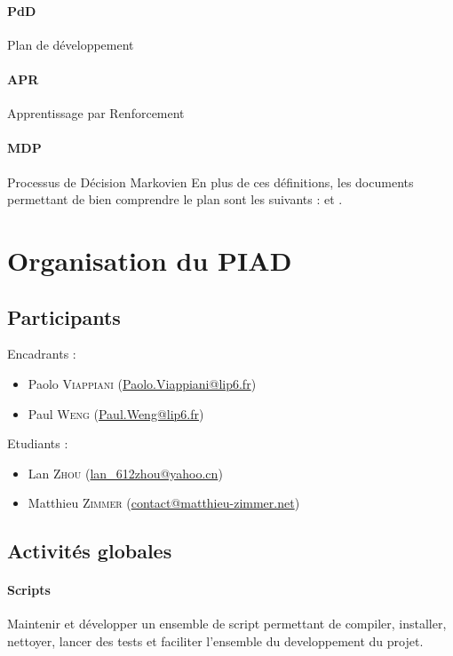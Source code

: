 \documentclass[a4paper,12pt]{article}
\begin{document}
   \paragraph{PdD} Plan de développement
   
   \paragraph{APR} Apprentissage par Renforcement
   
   \paragraph{MDP} Processus de Décision Markovien
  \bigskip
  En plus de ces définitions, les documents permettant de bien 
    comprendre le plan sont les suivants : \cite{PDMIA} et \cite{ReinforceLearningIntro}.
  
  \newpage 
  \section{Organisation du PIAD}

    \subsection{Participants}
	Encadrants :
	\begin{itemize}
		\item Paolo \textsc{Viappiani} (\href{mailto:Paolo.Viappiani@lip6.fr}{Paolo.Viappiani@lip6.fr})
		\item Paul \textsc{Weng} (\href{mailto:Paul.Weng@lip6.fr }{Paul.Weng@lip6.fr})
	\end{itemize}

	\bigskip
	Etudiants :
	\begin{itemize}
		\item Lan \textsc{Zhou} (\href{mailto:lan\_612zhou@yahoo.cn}{lan\_612zhou@yahoo.cn})
		\item Matthieu \textsc{Zimmer} (\href{mailto:contact@matthieu-zimmer.net}{contact@matthieu-zimmer.net})
	\end{itemize}

    
    \subsection{Activités globales}
      \paragraph{Scripts} Maintenir et développer un ensemble de script permettant de compiler, installer, nettoyer, lancer
      des tests et faciliter l'ensemble du developpement du projet.
     
\end{document}
